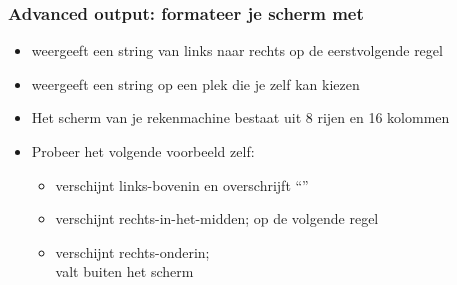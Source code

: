 \begin{frame}
\frametitle{Advanced output: formateer je scherm met }

\begin{itemize}
  \item<1->  weergeeft een string van links naar rechts op de eerstvolgende regel
  \item<2->  weergeeft een string op een plek die je zelf kan kiezen
\end{itemize}

\begin{itemize}
  \item<3-> Het scherm van je rekenmachine bestaat uit 8 rijen en 16 kolommen
  \item<4-> Probeer het volgende voorbeeld zelf:
  \begin{itemize}
    \item<5->  verschijnt links-bovenin en overschrijft ``''
    \item<6->  verschijnt rechts-in-het-midden;  op de volgende regel
    \item<7->  verschijnt rechts-onderin;\\  valt buiten het scherm
  \end{itemize} 
\end{itemize}

\vspace{2cm}



\end{frame}




